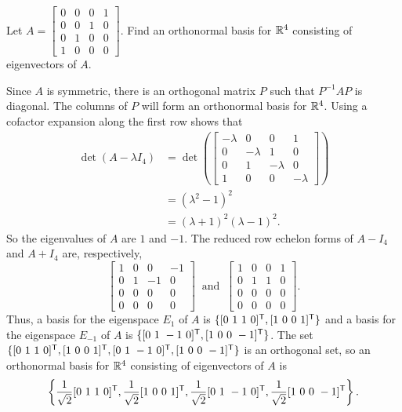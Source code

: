 \begin{example} Let $A = \left[ \begin{array}{cccc} 0&0&0&1 \\ 0&0&1&0 \\ 0&1&0&0 \\ 1&0&0&0 \end{array} \right]$. Find an orthonormal basis for $\mathbb{R}^4$ consisting of eigenvectors of $A$. 

\ExampleSolution

Since $A$ is symmetric, there is an orthogonal matrix $P$ such that $P^{-1}AP$ is diagonal. The columns of $P$ will form an orthonormal basis for $\mathbb{R}^4$. Using a cofactor expansion along the first row shows that 
\begin{align*}
\det(A-\lambda I_4) &= \det\left(\left[ \begin{array}{rrrr} -\lambda&0&0&1 \\ 0&-\lambda&1&0 \\ 0&1&-\lambda&0 \\ 1&0&0&-\lambda \end{array} \right] \right) \\
	&= \left(\lambda^2-1\right)^2 \\
	&= (\lambda+1)^2(\lambda-1)^2.
\end{align*}
So the eigenvalues of $A$ are $1$ and $-1$. The reduced row echelon forms of $A-I_4$ and $A+I_4$ are, respectively,  
\[\left[ \begin{array}{ccrr} 1&0&0&-1 \\ 0&1&-1&0 \\0&0&0&0 \\ 0&0&0&0 \end{array} \right] \ \text{ and } \ \left[ \begin{array}{cccc} 1&0&0&1 \\ 0&1&1&0 \\0&0&0&0 \\ 0&0&0&0 \end{array} \right].\]
Thus, a basis for the eigenspace $E_{1}$ of $A$ is $\{[0 \ 1 \ 1 \ 0]^{\tr}, [1 \ 0 \ 0 \ 1]^{\tr}\}$ and a basis for the eigenspace $E_{-1}$ of $A$ is $\{[0 \ 1 \ -1 \ 0]^{\tr}, [1 \ 0 \ 0 \ -1]^{\tr}\}$. The set $\{[0 \ 1 \ 1 \ 0]^{\tr}, [1 \ 0 \ 0 \ 1]^{\tr}, [0 \ 1 \ -1 \ 0]^{\tr}, [1 \ 0 \ 0 \ -1]^{\tr}\}$ is an orthogonal set, so an orthonormal basis for $\mathbb{R}^4$ consisting of eigenvectors of $A$ is
\[\left\{\frac{1}{\sqrt{2}} [0 \ 1 \ 1 \ 0]^{\tr}, \frac{1}{\sqrt{2}}[1 \ 0 \ 0 \ 1]^{\tr}, \frac{1}{\sqrt{2}}[0 \ 1 \ -1 \ 0]^{\tr}, \frac{1}{\sqrt{2}}[1 \ 0 \ 0 \ -1]^{\tr}\right\}.\]

\end{example}

